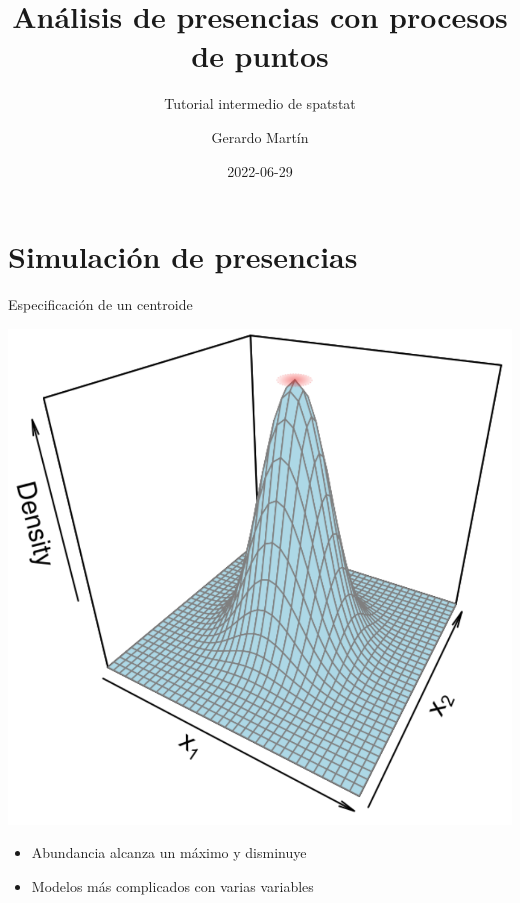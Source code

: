 \documentclass[
  11pt,
  ignorenonframetext,
]{beamer}
\title{Análisis de presencias con procesos de puntos}
\subtitle{Tutorial intermedio de spatstat}
\author{Gerardo Martín}
\date{2022-06-29}
\providecommand{\tightlist}{%
  \setlength{\itemsep}{0pt}\setlength{\parskip}{0pt}}
\begin{document}
\frame{\titlepage}

\hypertarget{simulaciuxf3n-de-presencias}{%
\section{Simulación de presencias}\label{simulaciuxf3n-de-presencias}}

\begin{frame}{Especificación de un centroide}
\protect\hypertarget{especificaciuxf3n-de-un-centroide}{}
\begin{center}\includegraphics[width=13.28in]{Figuras/Centroide} \end{center}

\begin{itemize}
\tightlist
\item
  Abundancia alcanza un máximo y disminuye
\item
  Modelos más complicados con varias variables
\end{itemize}
\end{frame}
\end{document}
